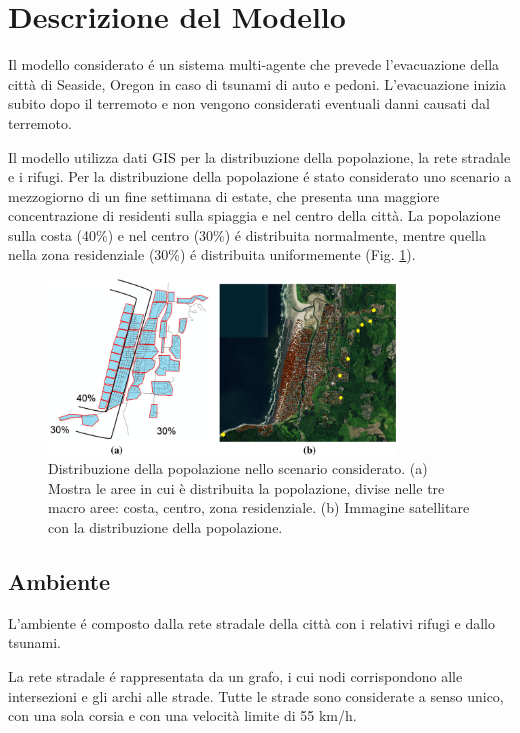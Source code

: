\section{Descrizione del Modello}
\label{sec:modello}
Il modello considerato \parencite{mostafizi2019agent} é un sistema multi-agente che prevede l'evacuazione della città di Seaside, Oregon in caso di tsunami di auto e pedoni.
%
L'evacuazione inizia subito dopo il terremoto e non vengono considerati eventuali danni causati dal terremoto.

Il modello utilizza dati GIS per la distribuzione della popolazione, la rete stradale e i rifugi.
%
Per la distribuzione della popolazione é stato considerato uno scenario a mezzogiorno di un fine settimana di estate,
che presenta una maggiore concentrazione di residenti sulla spiaggia e nel centro della città.
La popolazione sulla costa (40\%) e nel centro (30\%) é distribuita normalmente,
mentre quella nella zona residenziale (30\%) é distribuita uniformemente (Fig. \ref{fig:population}).

\begin{figure}[ht]
  \centering
  \includegraphics[width=0.82\textwidth]{images/population}
  \caption{Distribuzione della popolazione nello scenario considerato.
    (a) Mostra le aree in cui è distribuita la popolazione, divise nelle tre macro aree: costa, centro, zona residenziale.
    (b) Immagine satellitare con la distribuzione della popolazione.}
  \label{fig:population}
\end{figure}

\subsection{Ambiente}
L'ambiente é composto dalla rete stradale della città con i relativi rifugi e dallo tsunami.

La rete stradale é rappresentata da un grafo, i cui nodi corrispondono alle intersezioni e gli archi alle strade.
Tutte le strade sono considerate a senso unico, con una sola corsia e con una velocità limite di 55 km/h.

